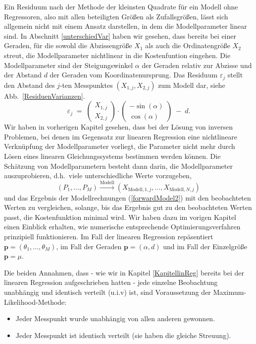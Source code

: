 Ein Residuum nach der Methode der kleinsten Quadrate für ein Modell ohne Regressoren,
also mit allen beteiligten Größen als Zufallsgrößen, lässt sich allgemein nicht mit
einem Ansatz darstellen, in dem die Modellparameter linear sind. In Abschnitt
\ref{unterschiedVar} haben wir gesehen, dass bereits bei einer
Geraden, für die sowohl die Abzissengröße $X_1$ als auch die Ordinatengröße $X_2$ streut,
die Modellparameter nichtlinear in die Kostenfuntion eingehen.
Die Modellparameter sind der Steigungswinkel $\alpha$ der Geraden relativ zur Abzisse und
der Abstand $d$ der Geraden vom Koordinatenursprung. Das Residuum $\varepsilon_j$ stellt den
Abstand des $j$-ten Messpunktes $(X_{1,j}, X_{2,j})$ zum Modell dar, siehe Abb.~\ref{ResiduenVarianzen}.
\begin{equation}
\varepsilon_j \; = \; 
\left(\begin{array}{c} X_{1,j}\\ X_{2,j}\end{array}\right) \cdot
\left(\begin{array}{c} -\sin(\alpha)\\ \cos(\alpha)\end{array}\right) \; - \; d .
\label{TLSgerade}
\end{equation}
Wir haben in vorherigen Kapitel gesehen, dass 
bei der Lösung von inversen Problemen, bei denen im Gegensatz zur linearen
Regression eine nichtlineare Verknüpfung der Modellparameter vorliegt,
die Parameter nicht mehr durch Lösen eines linearen Gleichungssystems
bestimmen werden können.
Die Schätzung von Modellparametern besteht dann darin, die Modellparameter auszuprobieren,
d.h.\ viele unterschiedliche Werte vorzugeben,
\begin{equation}
(P_1, \dots, P_M) \xrightarrow{\mathrm{Modell}} (X_{\mathrm{Modell},1,j}, \dots, X_{\mathrm{Modell},N,j})
\label{forwardModel2}
\end{equation} 
 und das Ergebnis der 
Modellrechnungen (\ref{forwardModel2}) mit den beobachteten Werten zu vergleichen, solange,
bis das Ergebnis \glqq gut zu den beobachteten Werten passt\grqq, die Kostenfunktion minimal wird.
Wir haben dazu im vorigen Kapitel einen Einblick erhalten, wie numerische entsprechende 
Optimierungsverfahren prinzipiell funktionieren.
Im Fall der linearen Regression repäsentiert $\mathbf{p} = (\theta_1,\dots,\theta_M)$,
im Fall der Geraden $\mathbf{p} = (\alpha, d)$ und im Fall der Einzelgröße
$\mathbf{p} = \mu$.

Die beiden Annahmen, dass - wie wir in Kapitel \ref{KapitellinReg} bereits bei der linearen Regression
aufgeschrieben hatten - jede einzelne Beobachtung unabhängig und identisch verteilt 
(u.i.v) ist, sind Voraussetzung der Maximum-Likelihood-Methode:
\begin{itemize}
\item Jeder Messpunkt wurde unabhängig von allen anderen gewonnen.
\item Jeder Messpunkt ist identisch verteilt (sie haben die gleiche Streuung).
\end{itemize}

